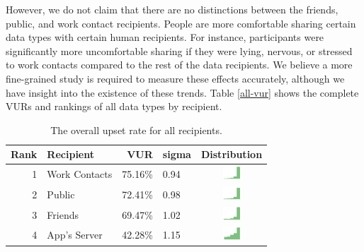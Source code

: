 \documentclass[conference]{IEEEtran}
\begin{document}
However, we do not claim that there are no distinctions between the friends, public, and work contact recipients. People are more comfortable sharing certain data types with certain human recipients. For instance, participants were significantly more uncomfortable sharing if they were lying, nervous, or stressed to work contacts compared to the rest of the data recipients. We believe a more fine-grained study is required to measure these effects accurately, although we have insight into the existence of these trends. Table \ref{all-vur} shows the complete VURs and rankings of all data types by recipient.

\begin{table}[t]
\begin{center}
\small
\begin{tabular}{| r | l | r | l |c |}
\hline
Rank & Recipient & VUR & sigma & Distribution \\
\hline
1 & Work Contacts & 75.16\% & 0.94 & \includegraphics[width = 2cm, height = 0.5cm]{tex-inputs/recipient4/recipient_work} \\
2 & Public & 72.41\% & 0.98 & \includegraphics[width = 2cm, height = 0.5cm]{tex-inputs/recipient4/recipient_pub}  \\
3 & Friends & 69.47\% & 1.02 & \includegraphics[width = 2cm, height = 0.5cm]{tex-inputs/recipient4/recipient_friends}\\
4 & App's Server & 42.28\% & 1.15 & \includegraphics[width = 2cm, height = 0.5cm]{tex-inputs/recipient4/recipient_app}\\
\hline
\end{tabular}
\caption{The overall upset rate for all recipients.}
\label{recipient-vur}
\end{center}
\end{table}
\end{document}
